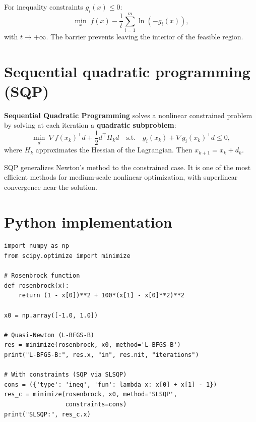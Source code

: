 \begin{definition}
For inequality constraints $g_i(x) \leq 0$:
\[
  \min_{x}\; f(x) - \frac{1}{t} \sum_{i=1}^m \ln(-g_i(x)),
\]
with $t \to +\infty$. The barrier prevents leaving the interior of the
feasible region.
\end{definition}

\section{Sequential quadratic programming (SQP)}

\begin{definition}[SQP]
\textbf{Sequential Quadratic Programming} solves a nonlinear constrained
problem by solving at each iteration a \textbf{quadratic subproblem}:
\[
  \min_{d}\; \nabla f(x_k)^\top d + \frac{1}{2} d^\top H_k d \quad
  \text{s.t.} \quad g_i(x_k) + \nabla g_i(x_k)^\top d \leq 0,
\]
where $H_k$ approximates the Hessian of the Lagrangian. Then
$x_{k+1} = x_k + d_k$.
\end{definition}

\begin{remark}
SQP generalizes Newton's method to the constrained case. It is one of the most
efficient methods for medium-scale nonlinear optimization, with superlinear
convergence near the solution.
\end{remark}

\section{Python implementation}

\begin{codeblock}[title=\textbf{Nonlinear optimization with SciPy}]
\begin{verbatim}
import numpy as np
from scipy.optimize import minimize

# Rosenbrock function
def rosenbrock(x):
    return (1 - x[0])**2 + 100*(x[1] - x[0]**2)**2

x0 = np.array([-1.0, 1.0])

# Quasi-Newton (L-BFGS-B)
res = minimize(rosenbrock, x0, method='L-BFGS-B')
print("L-BFGS-B:", res.x, "in", res.nit, "iterations")

# With constraints (SQP via SLSQP)
cons = ({'type': 'ineq', 'fun': lambda x: x[0] + x[1] - 1})
res_c = minimize(rosenbrock, x0, method='SLSQP',
                 constraints=cons)
print("SLSQP:", res_c.x)
\end{verbatim}
\end{codeblock}

